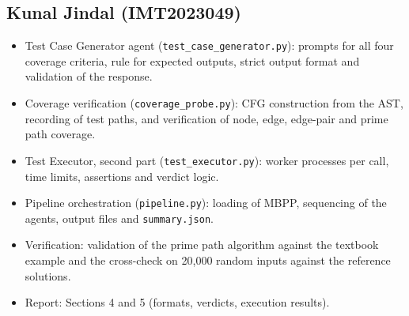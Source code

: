 \documentclass[11pt, a4paper]{article}
\begin{document}
\subsection*{Kunal Jindal (IMT2023049)}
\begin{itemize}
    \item Test Case Generator agent (\texttt{test\_case\_generator.py}): prompts for all four coverage criteria, rule for expected outputs, strict output format and validation of the response.
    \item Coverage verification (\texttt{coverage\_probe.py}): CFG construction from the AST, recording of test paths, and verification of node, edge, edge-pair and prime path coverage.
    \item Test Executor, second part (\texttt{test\_executor.py}): worker processes per call, time limits, assertions and verdict logic.
    \item Pipeline orchestration (\texttt{pipeline.py}): loading of MBPP, sequencing of the agents, output files and \texttt{summary.json}.
    \item Verification: validation of the prime path algorithm against the textbook example and the cross-check on 20,000 random inputs against the reference solutions.
    \item Report: Sections 4 and 5 (formats, verdicts, execution results).
\end{itemize}
\end{document}
